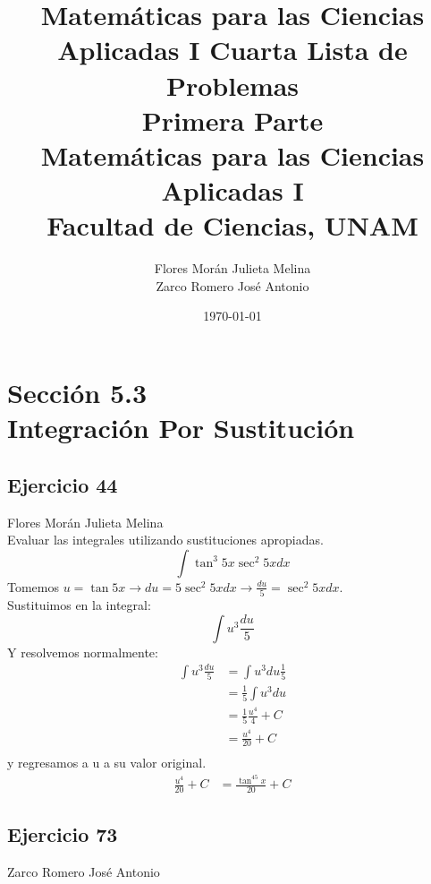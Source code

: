 \documentclass[12pt]{article}
\title{Matemáticas para las Ciencias Aplicadas I}
\title{
	Cuarta Lista de Problemas \\
	\textbf{Primera  Parte} \\
	\vspace{1ex}
	\large Matemáticas para las Ciencias Aplicadas I \\
	Facultad de Ciencias, UNAM}
\date{\today}
\author{Flores Morán Julieta Melina \\ Zarco Romero José Antonio}
\begin{document}
\maketitle

\section{Sección 5.3 \\ Integración Por Sustitución}
\subsection{Ejercicio 44} Flores Morán Julieta Melina \\

Evaluar las integrales utilizando sustituciones apropiadas.
\[
\int \tan^3{5x}\sec^2{5x}dx
\]
Tomemos $u=\tan{5x} \rightarrow du = 5 \sec^{2}5xdx \rightarrow \frac{du}{5} = \sec^{2}5xdx $. \\
Sustituimos en la integral:
\[
\int u^3 \frac{du}{5}
\]
Y resolvemos normalmente:\\
\begin{align*}
  \int u^3 \frac{du}{5}
  & = \int u^3 du \frac{1}{5} \\
  & = \frac{1}{5} \int u^3 du \\
  & = \frac{1}{5} \frac {u^4}{4} + C \\
  & = \frac {u^4}{20} + C\\
\end{align*}
y regresamos a u a su valor original.
\begin{align*}
  \frac {u^4}{20} + C 
  & = \frac{\tan^45x}{20} + C
\end{align*}
\subsection{Ejercicio 73} Zarco Romero José Antonio \\
\end{document}
